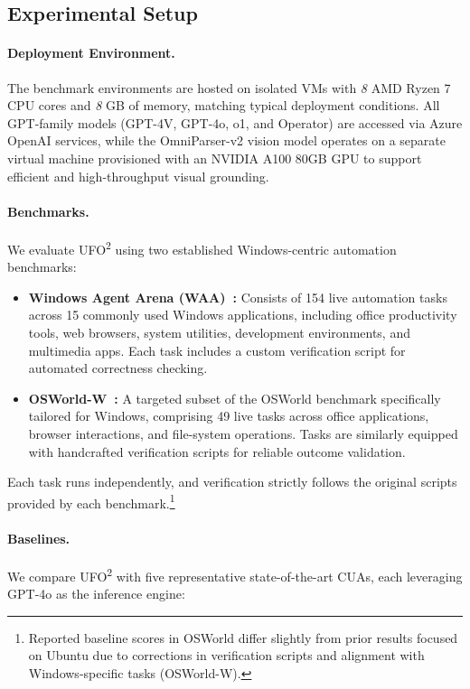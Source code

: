 \documentclass[sigplan,10pt]{acmart}
\newcommand{\name}{\textsc{UFO}\textsuperscript{2}\xspace}
\begin{document}
\subsection{Experimental Setup}

\paragraph{Deployment Environment.} 
The benchmark environments are hosted on isolated VMs with \textit{8} AMD Ryzen 7 CPU cores and \textit{8} GB of memory, matching typical deployment conditions.  All GPT-family models (GPT-4V, GPT-4o, o1, and Operator) are accessed via Azure OpenAI services, while the OmniParser-v2 vision model operates on a separate virtual machine provisioned with an NVIDIA A100 80GB GPU to support efficient and high-throughput visual grounding.

\paragraph{Benchmarks.} 
We evaluate \name using two established Windows-centric automation benchmarks:
\begin{itemize} 
    \item \textbf{Windows Agent Arena (WAA)~\cite{bonatti2024windows}:} 
    Consists of 154 live automation tasks across 15 commonly used Windows applications, including office productivity tools, web browsers, system utilities, development environments, and multimedia apps. Each task includes a custom verification script for automated correctness checking.

    \item \textbf{OSWorld-W~\cite{xie2024osworld}:} 
    A targeted subset of the OSWorld benchmark specifically tailored for Windows, comprising 49 live tasks across office applications, browser interactions, and file-system operations. Tasks are similarly equipped with handcrafted verification scripts for reliable outcome validation.
\end{itemize}

Each task runs independently, and verification strictly follows the original scripts provided by each benchmark.\footnote{Reported baseline scores in OSWorld differ slightly from prior results focused on Ubuntu due to corrections in verification scripts and alignment with Windows-specific tasks (OSWorld-W).}

\paragraph{Baselines.} 
We compare \name with five representative state-of-the-art CUAs, each leveraging GPT-4o as the inference engine:
\end{document}
